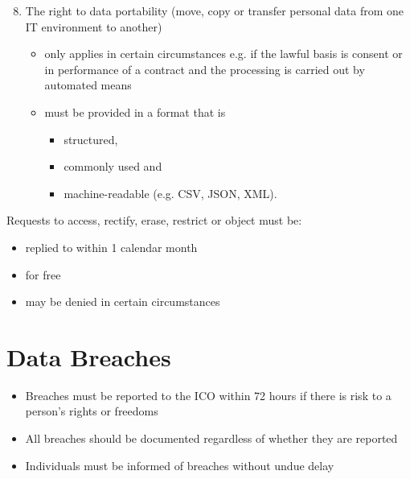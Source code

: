 \documentclass{article}
\begin{document}
\begin{enumerate}
\setcounter{enumi}{7}
\item The right to data portability (move, copy or transfer personal data from one IT environment to another)
\begin{itemize}
\item only applies in certain circumstances e.g. if the lawful basis is consent or in performance of a contract and the processing is carried out by automated means
\item must be provided in a format that is
\begin{itemize}
\item structured,
\item commonly used and
\item machine-readable (e.g. CSV, JSON, XML).
\end{itemize}
\end{itemize}
\end{enumerate}

\bigskip
Requests to access, rectify, erase, restrict or object must be:
\begin{itemize}
\item replied to within 1 calendar month
\item for free 
\item may be denied in certain circumstances
\end{itemize}



\section{Data Breaches}
\begin{itemize}
\item Breaches must be reported to the ICO within 72 hours if there is risk to a person's rights or freedoms
\item All breaches should be documented regardless of whether they are reported
\item Individuals must be informed of breaches without undue delay
\end{itemize}
\end{document}
